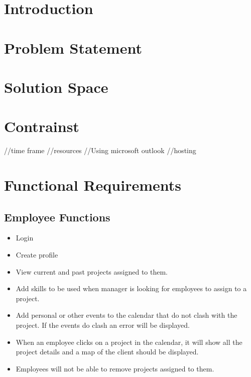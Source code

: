 \documentclass{article}
\begin{document}
\section{Introduction}
  \begin{paragraph}
  
  \end{paragraph}
 
  \section{Problem Statement}
  \begin{paragraph}
  
  \end{paragraph}
  
  \section{Solution Space}
  \begin{paragraph}
  
  \end{paragraph}
  
  \section{Contrainst}
  \begin{paragraph}
  //time frame
  //resources
  //Using microsoft outlook
  //hosting
  \end{paragraph}
  
  \section{Functional Requirements}
	\subsection{Employee Functions}
		\begin{itemize}
			\item Login
			\item Create profile
			\item View current and past projects assigned to them. 
			\item Add skills to be used when manager is looking for employees to assign to a project.
			\item Add personal or other events to the calendar that do not clash with the project. If the events do clash an error will be displayed.  
			\item When an employee clicks on a project in the calendar, it will show all the project details and a map of the client should be displayed.
			\item Employees will not be able to remove projects assigned to them.
		\end{itemize}
\end{document}
